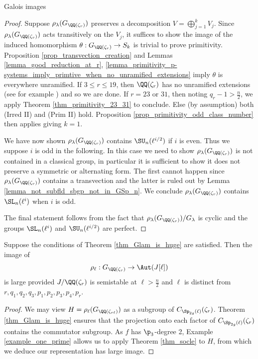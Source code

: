 \documentclass[11pt,a4paper]{article}
\newcommand{\Qr}{{\QQ(\zeta_r)}}
\newcommand{\GQr}{G_{\QQ(\zeta_{r})}}
\newcommand{\GQrl}{G_{\QQ(\zeta_{r\ell})}}
\newcommand{\zr}{\zeta_r}
\newcommand{\Glam}{G_{\lambda}}
\begin{document}
\begin{section}{Galois images}
\begin{proof}
Suppose $\rho_\lambda(\GQr)$ preserves a decomposition $V=\bigoplus_{j=1}^k V_j$.
Since $\rho_\lambda(\GQr)$ acts transitively on the $V_j$, it suffices to show the image of the induced homomorphism $\theta:\GQr \rightarrow S_k $ is trivial to prove primitivity.
Proposition \ref{prop_transvection_creation} and Lemmas \ref{lemma_good_reduction_at_r}, \ref{lemma_primitivity_p-systems_imply_primtive_when_no_unramified_extensions} imply $\theta$ is everywhere unramified.
If $3 \leq r \leq 19$, then $\Qr$ has no unramified extensions (see for example \cite[Appendix]{Yamamura_imaginary_abelian_NF_with_class_numbe_one}) and so we are done.
If $r=23$ or $31$, then noting $q_r -1 > \frac{n}{2}$, we apply Theorem \ref{thm_primitivity_23_31} to conclude.
Else (by assumption) both (Irred II) and (Prim II) hold. Proposition \ref{prop_primitivity_odd_class_number} then applies giving $k=1$.


We have now shown $\rho_\lambda(\GQr)$ contains $\SU_n(\ell^{i/2})$ if $i$ is even. Thus we suppose $i$ is odd in the following.
In this case we need to show $\rho_\lambda(\GQr)$ is not contained in a classical group, in particular it is sufficient to show it does not preserve a symmetric or alternating form.
The first cannot happen since $\rho_\lambda(\GQr)$ contains a transvection \cite[Prop. 5.7]{Grove} and the latter is ruled out by Lemma \ref{lemma_not_subfld_sbgp_not_in_GSp_n}. We conclude $\rho_\lambda(\GQr)$ contains $\SL_n(\ell^{i})$ when $i$ is odd.

The final statement follows from the fact that $\rho_\lambda(\GQr)/\Glam$ is cyclic and the groups $\SL_n(\ell^i)$ and $\SU_n(\ell^{i/2})$ are perfect.
\end{proof}



\begin{theorem}
\label{thm_mod_l_image_is_huge}
Suppose the conditions of Theorem \ref{thm_Glam_is_huge} are satisfied.
Then the image of  \[\rho_\ell:\GQr \rightarrow \Aut(J[\ell])\] is large provided  $J/\Qr$ is semistable at $\ell> \frac{n}{2}$ and $\ell$ is distinct from $r,q_1,q_2,q_3,p_1,p_2,p_3,p_4,p_r$.
\end{theorem}

\begin{proof}
We may view $H = \rho_\ell(\GQrl)$ as a subgroup of $C_{\Sp_{2g}(\ell)}(\zr)$.
Theorem \ref{thm_Glam_is_huge} ensures that the projection onto each factor of $C_{\Sp_{2g}(\ell)}(\zr)$ contains the commutator subgroup.
As $f$ has $\p_3$-degree 2, Example \ref{example_one_prime} allows us to apply Theorem \ref{thm_socle} to $H$, from which we deduce our representation has large image.
\end{proof}



\end{section}
\end{document}
